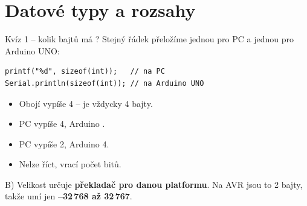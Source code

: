 \documentclass[12pt,aspectratio=169]{beamer}
\newenvironment{odpovedi}{\footnotesize\begin{itemize}\itemsep1pt}{\end{itemize}}
\newcommand{\spravne}[1]{\alt<1>{#1}{\pozor{#1}}}
\begin{document}
\section{Datové typy a rozsahy}

\begin{frame}[fragile]{Kvíz 1 -- kolik bajtů má ?}
  Stejný řádek přeložíme jednou pro PC a jednou pro Arduino UNO:
\begin{lstlisting}[style=arduino_bez_cisel]
printf("%d", sizeof(int));   // na PC
Serial.println(sizeof(int)); // na Arduino UNO
\end{lstlisting}

  \begin{odpovedi}
    \item[A)] Obojí vypíše 4 --  je vždycky 4 bajty.
    \item[B)] PC vypíše 4, Arduino \spravne{2}.
    \item[C)] PC vypíše 2, Arduino 4.
    \item[D)] Nelze říct,  vrací počet bitů.
  \end{odpovedi}

  \pause
  \begin{exampleblock}{B)}
    \footnotesize Velikost  určuje \textbf{překladač pro danou platformu}.
    Na AVR jsou to 2 bajty, takže  umí jen \textbf{--32\,768 až 32\,767}.
  \end{exampleblock}
\end{frame}
\end{document}

